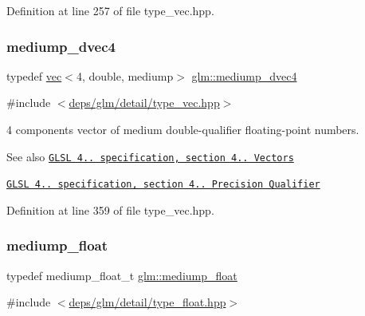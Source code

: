 Definition at line 257 of file type\+\_\+vec.\+hpp.

\mbox{\label{group__core__precision_ga860fd4068c3e89885f814e3b8f312f2f}} 
\subsubsection{\texorpdfstring{mediump\+\_\+dvec4}{mediump\_dvec4}}
{\footnotesize\ttfamily typedef \hyperlink{structglm_1_1vec}{vec}$<$4, double, mediump$>$ \hyperlink{group__core__precision_ga860fd4068c3e89885f814e3b8f312f2f}{glm\+::mediump\+\_\+dvec4}}



{\ttfamily \#include $<$\hyperlink{type__vec_8hpp}{deps/glm/detail/type\+\_\+vec.\+hpp}$>$}

4 components vector of medium double-\/qualifier floating-\/point numbers.

\begin{DoxySeeAlso}{See also}
\href{http://www.opengl.org/registry/doc/GLSLangSpec.4.20.8.pdf}{\tt G\+L\+SL 4.. specification, section 4.. Vectors} 

\href{http://www.opengl.org/registry/doc/GLSLangSpec.4.20.8.pdf}{\tt G\+L\+SL 4.. specification, section 4.. Precision Qualifier} 
\end{DoxySeeAlso}


Definition at line 359 of file type\+\_\+vec.\+hpp.

\mbox{\label{group__core__precision_gac785826c039fe6c97c03b37c81c1a68e}} 
\subsubsection{\texorpdfstring{mediump\+\_\+float}{mediump\_float}}
{\footnotesize\ttfamily typedef mediump\+\_\+float\+\_\+t \hyperlink{group__core__precision_gac785826c039fe6c97c03b37c81c1a68e}{glm\+::mediump\+\_\+float}}



{\ttfamily \#include $<$\hyperlink{type__float_8hpp}{deps/glm/detail/type\+\_\+float.\+hpp}$>$}

